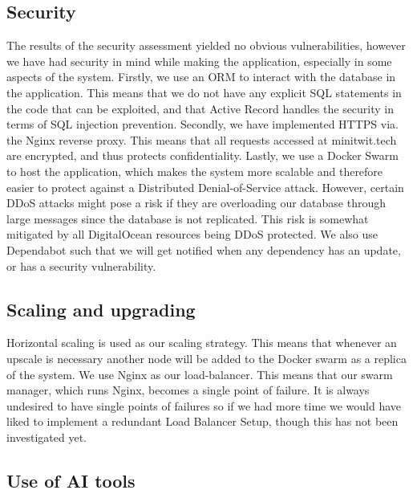 \documentclass{article}
\begin{document}
\subsection{Security}
The results of the security assessment yielded no obvious vulnerabilities, however we have had security in mind while making the application, especially in some aspects of the system. Firstly, we use an ORM to interact with the database in the application. This means that we do not have any explicit SQL statements in the code that can be exploited, and that Active Record handles the security in terms of SQL injection prevention. Secondly, we have implemented HTTPS via. the Nginx reverse proxy. This means that all requests accessed at minitwit.tech are encrypted, and thus protects confidentiality. Lastly, we use a Docker Swarm to host the application, which makes the system more scalable and therefore easier to protect against a Distributed Denial-of-Service attack. However, certain DDoS attacks might pose a risk if they are overloading our database through large messages since the database is not replicated. This risk is somewhat mitigated by all DigitalOcean resources being DDoS protected.
We also use Dependabot such that we will get notified when any dependency has an update, or has a security vulnerability.

\subsection{Scaling and upgrading}

Horizontal scaling is used as our scaling strategy. This means that whenever an upscale is necessary another node will be added to the Docker swarm as a replica of the system. We use Nginx as our load-balancer. This means that our swarm manager, which runs Nginx, becomes a single point of failure. It is always undesired to have single points of failures so if we had more time we would have liked to implement a redundant Load Balancer Setup, though this has not been investigated yet.


\subsection{Use of AI tools}
\end{document}
